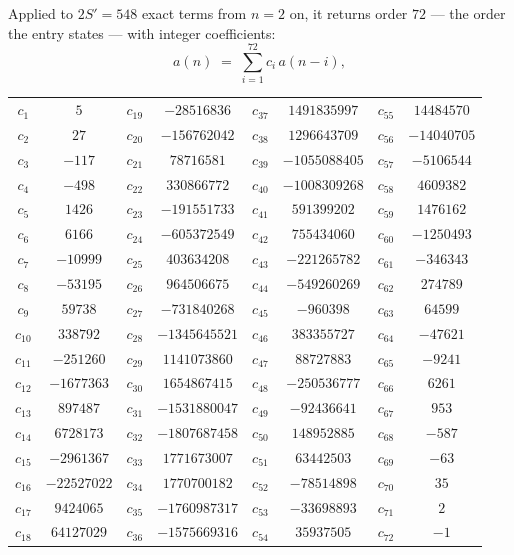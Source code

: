 \documentclass[11pt,a4paper]{article}
\theoremstyle{plain}
\theoremstyle{definition}
\begin{document}
Applied to $2S'=548$ exact terms from $n=2$ on, it returns order $72$ --- the
order the entry states --- with integer coefficients:
\[
a(n)\;=\;\sum_{i=1}^{72}c_i\,a(n-i),
\]
\begin{center}\small
\begin{tabular}{cccccccc}
$c_{1}$ & $5$ & $c_{19}$ & $-28516836$ & $c_{37}$ & $1491835997$ & $c_{55}$ & $14484570$ \\
$c_{2}$ & $27$ & $c_{20}$ & $-156762042$ & $c_{38}$ & $1296643709$ & $c_{56}$ & $-14040705$ \\
$c_{3}$ & $-117$ & $c_{21}$ & $78716581$ & $c_{39}$ & $-1055088405$ & $c_{57}$ & $-5106544$ \\
$c_{4}$ & $-498$ & $c_{22}$ & $330866772$ & $c_{40}$ & $-1008309268$ & $c_{58}$ & $4609382$ \\
$c_{5}$ & $1426$ & $c_{23}$ & $-191551733$ & $c_{41}$ & $591399202$ & $c_{59}$ & $1476162$ \\
$c_{6}$ & $6166$ & $c_{24}$ & $-605372549$ & $c_{42}$ & $755434060$ & $c_{60}$ & $-1250493$ \\
$c_{7}$ & $-10999$ & $c_{25}$ & $403634208$ & $c_{43}$ & $-221265782$ & $c_{61}$ & $-346343$ \\
$c_{8}$ & $-53195$ & $c_{26}$ & $964506675$ & $c_{44}$ & $-549260269$ & $c_{62}$ & $274789$ \\
$c_{9}$ & $59738$ & $c_{27}$ & $-731840268$ & $c_{45}$ & $-960398$ & $c_{63}$ & $64599$ \\
$c_{10}$ & $338792$ & $c_{28}$ & $-1345645521$ & $c_{46}$ & $383355727$ & $c_{64}$ & $-47621$ \\
$c_{11}$ & $-251260$ & $c_{29}$ & $1141073860$ & $c_{47}$ & $88727883$ & $c_{65}$ & $-9241$ \\
$c_{12}$ & $-1677363$ & $c_{30}$ & $1654867415$ & $c_{48}$ & $-250536777$ & $c_{66}$ & $6261$ \\
$c_{13}$ & $897487$ & $c_{31}$ & $-1531880047$ & $c_{49}$ & $-92436641$ & $c_{67}$ & $953$ \\
$c_{14}$ & $6728173$ & $c_{32}$ & $-1807687458$ & $c_{50}$ & $148952885$ & $c_{68}$ & $-587$ \\
$c_{15}$ & $-2961367$ & $c_{33}$ & $1771673007$ & $c_{51}$ & $63442503$ & $c_{69}$ & $-63$ \\
$c_{16}$ & $-22527022$ & $c_{34}$ & $1770700182$ & $c_{52}$ & $-78514898$ & $c_{70}$ & $35$ \\
$c_{17}$ & $9424065$ & $c_{35}$ & $-1760987317$ & $c_{53}$ & $-33698893$ & $c_{71}$ & $2$ \\
$c_{18}$ & $64127029$ & $c_{36}$ & $-1575669316$ & $c_{54}$ & $35937505$ & $c_{72}$ & $-1$ \\
\end{tabular}
\end{center}
\end{document}
